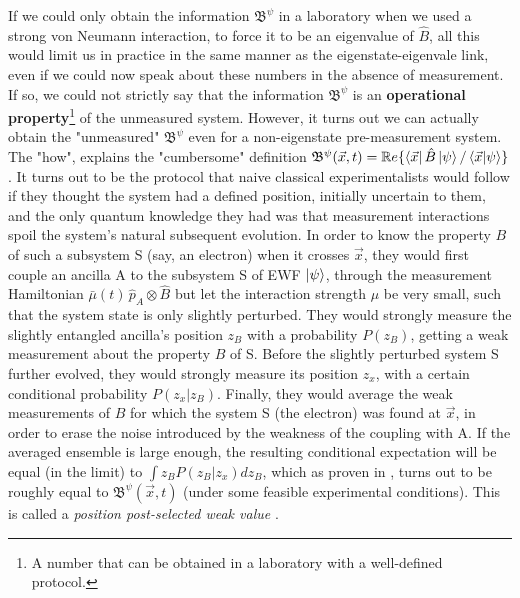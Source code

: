 \documentclass[11pt, a4paper]{article} %
\newcommand{\B}{\mathfrak{B}}
\begin{document}
If we could only obtain the information $\B^\psi$ in a laboratory when we used a strong von Neumann interaction, to force it to be an eigenvalue of $\hat{B}$, all this would limit us in practice in the same manner as the eigenstate-eigenvale link, even if we could now speak about these numbers in the absence of measurement. If so, we could not strictly say that the information $\B^\psi$ is an {\bf operational property}\footnote{A number that can be obtained in a laboratory with a well-defined protocol.} of the unmeasured system. However, it turns out we can actually obtain the "unmeasured" $\B^\psi$ even for a non-eigenstate pre-measurement system. The "how", explains the "cumbersome" definition $\B^\psi(\vec{x},t)=\mathbb{R}e\{\bra{\vec{x}}\hat{B}\ket{\psi}/\bra{\vec{x}}\ket{\psi}\}$. It turns out to be the protocol that naive classical experimentalists \cite{WisemanVel} would follow if they thought the system had a defined position, initially uncertain to them, and the only quantum knowledge they had was that measurement interactions spoil the system's natural subsequent evolution. In order to know the property $B$ of such a subsystem S (say, an electron) when it crosses $\vec{x}$, they would first couple an ancilla A to the subsystem S of EWF $\ket{\psi}$, through the measurement Hamiltonian $\bar{\mu}(t)\,\hat{p}_A\otimes\hat{B}$ but let the interaction strength $\mu$ be very small, such that the system state is only slightly perturbed. They would strongly measure the slightly entangled ancilla's position $z_B$ with a probability $P(z_B)$, getting a weak measurement about the property $B$ of S. Before the slightly perturbed system S further evolved, they would strongly measure its position $z_x$, with a certain conditional probability $P(z_x|z_B)$. Finally, they would average the weak measurements of $B$ for which the system S (the electron) was found at $\vec{x}$, in order to erase the noise introduced by the weakness of the coupling with A. If the averaged ensemble is large enough, the resulting conditional expectation will be equal (in the limit) to $\int z_B P(z_B|z_x)dz_B$, which as proven in \cite{DevInPosition2}, turns out to be roughly equal to $\B^\psi(\vec{x},t)$ (under some feasible experimental conditions). This is called a {\em position post-selected weak value} \cite{Weak}.
\end{document}

